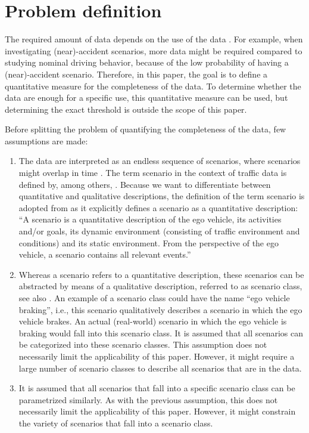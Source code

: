 \section{Problem definition}
\label{sec:problem}

The required amount of data depends on the use of the data \cite{wang2017much}. For example, when investigating (near)-accident scenarios, more data might be required compared to studying nominal driving behavior, because of the low probability of having a (near)-accident scenario. Therefore, in this paper, the goal is to define a quantitative measure for the completeness of the data. To determine whether the data are enough for a specific use, this quantitative measure can be used, but determining the exact threshold is outside the scope of this paper.


Before splitting the problem of quantifying the completeness of the data, few assumptions are made:
\begin{enumerate}
	\item The data are interpreted as an endless sequence of scenarios, where scenarios might overlap in time \cite{elrofai2018scenario}. The term scenario in the context of traffic data is defined by, among others, \textcite{geyer2014, ulbrich2015, elrofai2016scenario, elrofai2018scenario}. Because we want to differentiate between quantitative and qualitative descriptions, the definition of the term scenario is adopted from \textcite{elrofai2018scenario} as it explicitly defines a scenario as a quantitative description: ``A scenario is a quantitative description of the ego vehicle, its activities and/or goals, its dynamic environment (consisting of traffic environment and conditions) and its static environment. From the perspective of the ego vehicle, a scenario contains all relevant events.''
	
	\item Whereas a scenario refers to a quantitative description, these scenarios can be abstracted by means of a qualitative description, referred to as scenario class, see also \textcite{ploeg2018cetran, elrofai2018scenario}. An example of a scenario class could have the name ``ego vehicle braking'', i.e., this scenario qualitatively describes a scenario in which the ego vehicle brakes. An actual (real-world) scenario in which the ego vehicle is braking would fall into this scenario class. It is assumed that all scenarios can be categorized into these scenario classes. This assumption does not necessarily limit the applicability of this paper. However, it might require a large number of scenario classes to describe all scenarios that are in the data.
	
	\item It is assumed that all scenarios that fall into a specific scenario class can be parametrized similarly. As with the previous assumption, this does not necessarily limit the applicability of this paper. However, it might constrain the variety of scenarios that fall into a scenario class. 
\end{enumerate}

